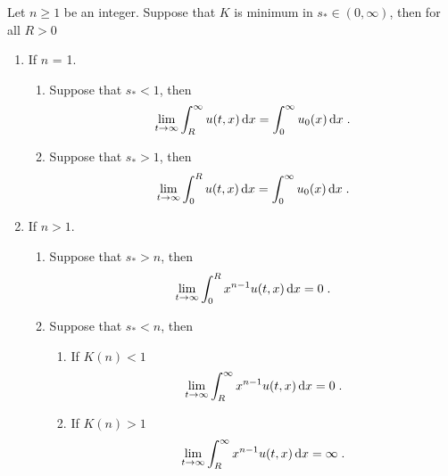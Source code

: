 \documentclass[11pt]{amsart}
\newcommand{\diff}{\,\mathrm{d}}
\begin{document}
        \begin{proposition}
            \label{p:locationmoment} Let $n\geq 1$ be an integer. Suppose that $K$ is minimum in $s_* \in (0, \infty)$, then for all $R > 0$
            \begin{enumerate}
                \item If $n$ = 1. 
                \begin{enumerate}
                    \item Suppose that $s_* < 1$, then
                        \begin{align*}
                        \lim_{t\to \infty} \int_R^\infty u(t,x) \diff x = \int_0^\infty u_0(x) \diff x
                        \eqfinp
                        \end{align*}
                    \item Suppose that $s_* > 1$, then
                        \begin{align*}
                        \lim_{t\to \infty} \int_0^R u(t,x) \diff x = \int_0^\infty u_0(x) \diff x
                        \eqfinp
                        \end{align*}
                \end{enumerate}
                \item If $n > 1$.
                    \begin{enumerate}
                    \item Suppose that $s_* > n$, then 
                        \begin{align*}
                        \lim_{t\to \infty} \int_0^R x^{n-1} u(t,x) \diff x = 0
                        \eqfinp
                        \end{align*}
                    \item Suppose that $s_* < n$, then 
                    \begin{enumerate}
                    \item If $K(n) < 1$
                        \begin{align*}
                        \lim_{t\to \infty} \int_R^{\infty} x^{n-1} u(t,x) \diff x = 0
                        \eqfinp
                        \end{align*}
                    \item If $K(n) > 1$
                        \begin{align*}
                        \lim_{t\to \infty} \int_R^{\infty} x^{n-1} u(t,x) \diff x = \infty
                        \eqfinp
                        \end{align*}
                \end{enumerate}
            \end{enumerate}
        \end{enumerate}
        \end{proposition}
        
\end{document}

